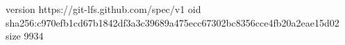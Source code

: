 version https://git-lfs.github.com/spec/v1
oid sha256:c970efb1cd67b1842df3a3c39689a475ecc67302bc8356cce4fb20a2eae15d02
size 9934
